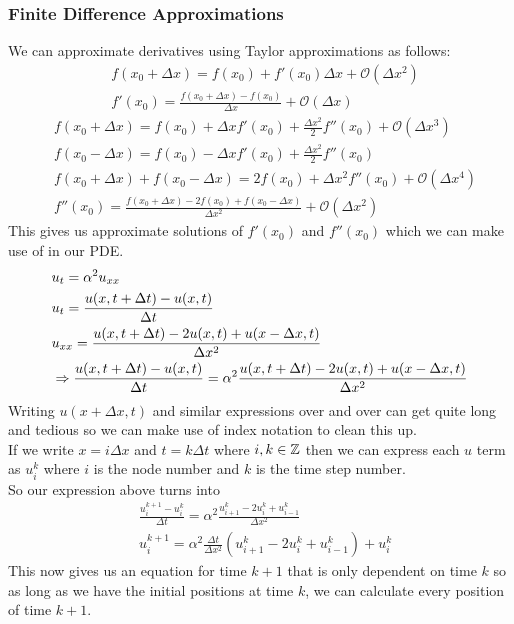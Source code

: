 \documentclass[11pt, fleqn]{article}
\begin{document}
\subsubsection{Finite Difference Approximations}
We can approximate derivatives using Taylor approximations as follows:
\begin{align*}
    &f(x_0+\Delta x)=f(x_0)+f'(x_0)\Delta x+\mathcal{O}(\Delta x^2)\\
    &f'(x_0)=\frac{f(x_0+\Delta x)-f(x_0)}{\Delta x}+\mathcal{O}(\Delta x)
\end{align*}
\begin{align*}
    &f(x_0+\Delta x)=f(x_0)+\Delta xf'(x_0)+\frac{\Delta x^2}{2}f''(x_0)+\mathcal{O}(\Delta x^3)\\
    &f(x_0-\Delta x)=f(x_0)-\Delta xf'(x_0)+\frac{\Delta x^2}{2}f''(x_0)\\
    &f(x_0+\Delta x)+f(x_0-\Delta x)=2f(x_0)+\Delta x^2f''(x_0)+\mathcal{O}(\Delta x^4)\\
    &f''(x_0)=\frac{f(x_0+\Delta x)-2f(x_0)+f(x_0-\Delta x)}{\Delta x^2}+\mathcal{O}(\Delta x^2)
\end{align*}
This gives us approximate solutions of $f'(x_0)$ and $f''(x_0)$ which we can make use of in our PDE.
\begin{align*}
    &u_t=\alpha^2u_{xx}\\
    &u_t=\frac{u(x,t+\Delta t)-u(x,t)}{\Delta t}\\
    &u_{xx}=\frac{u(x,t+\Delta t)-2u(x,t)+u(x-\Delta x,t)}{\Delta x^2}\\
    &\Rightarrow \frac{u(x,t+\Delta t)-u(x,t)}{\Delta t}=\alpha^2\frac{u(x,t+\Delta t)-2u(x,t)+u(x-\Delta x,t)}{\Delta x^2}
\end{align*}
Writing $u(x+\Delta x,t)$ and similar expressions over and over can get quite long and tedious so we can make use of index notation to clean this up.\\
If we write $x=i\Delta x$ and $t=k\Delta t$ where $i,k\in\mathbb{Z}$ then we can express each $u$ term as $u_i^k$ where $i$ is the node number and $k$ is the time step number.\\
So our expression above turns into
\begin{align*}
    &\frac{u_i^{k+1}-u_i^k}{\Delta t}=\alpha^2\frac{u_{i+1}^k-2u_i^k+u_{i-1}^k}{\Delta x^2}\\
    &u_i^{k+1}=\alpha^2\frac{\Delta t}{\Delta x^2}(u_{i+1}^k-2u_i^k+u_{i-1}^k)+u_i^k
\end{align*}
This now gives us an equation for time $k+1$ that is only dependent on time $k$ so as long as we have the initial positions at time $k$, we can calculate every position of time $k+1$.\\
\end{document}

